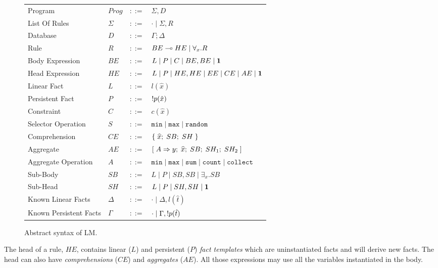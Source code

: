 \begin{figure}[t]
\centering
\begin{tabular}{ l l c l }
  Program & $Prog$ & $::=$ & $\Sigma, D$ \\
  List Of Rules & $\Sigma$ & $::=$ & $\cdot \; | \; \Sigma, R$\\
  Database & $D$ & $::=$ & $\Gamma; \Delta$ \\
  Rule & $R$ & $::=$ & $BE \multimap HE \; | \; \forall_{x}. R$ \\
  Body Expression & $BE$ & $::=$ & $L \; | \; P \; | \; C \; | \; BE, BE \; | \; \mathbf{1}$\\
  Head Expression & $HE$ & $::=$ & $L \; | \; P \; | \; HE, HE \; | \; EE \; |
  \; CE \; | \; AE \; | \; \mathbf{1}$\\
  
  Linear Fact & $L$ & $::=$ & $l(\hat{x})$\\
  Persistent Fact & $P$ & $::=$ & ${!} p(\hat{x})$\\
  Constraint & $C$ & $::=$ & $c(\hat{x})$ \\
  Selector Operation & $S$ & $::=$ & $\mathtt{min} \; | \; \mathtt{max} \; | \; \mathtt{random}$\\
  
  Comprehension & $CE$ & $::=$ & $\{ \; \widehat{x}; \; SB; \; SH \; \}$ \\

  Aggregate & $AE$ & $::=$ & $[\; A \Rightarrow y; \; \widehat{x}; \; SB; \; SH_1; \; SH_2 \;]$ \\

  Aggregate Operation & $A$ & $::=$ & $\mathtt{min} \; | \; \mathtt{max} \; | \;
\mathtt{sum} \; | \; \mathtt{count} \; | \; \mathtt{collect}$ \\
  
  Sub-Body & $SB$ & $::=$ & $L \; | \; P \; | \; SB, SB \; | \; \exists_{x}. SB$\\
  Sub-Head & $SH$ & $::=$ & $L \; | \; P \; | \; SH, SH \; | \; \mathbf{1}$\\
  
  Known Linear Facts & $\Delta$ & $::=$ & $\cdot \; | \; \Delta, l(\hat{t})$ \\
  Known Persistent Facts & $\Gamma$ & $::=$ & $\cdot \; | \; \Gamma, {!} p(\hat{t})$ \\
\end{tabular}
\caption{Abstract syntax of LM.}
\label{tbl:ast}
\end{figure}

The head of a rule, $HE$, contains linear ($L$) and persistent ($P$) \emph{fact
   templates} which are uninstantiated facts and will derive new facts. The head
can also have \emph{comprehensions} ($CE$) and \emph{aggregates} ($AE$). All
those expressions may use all the variables instantiated in the body.


